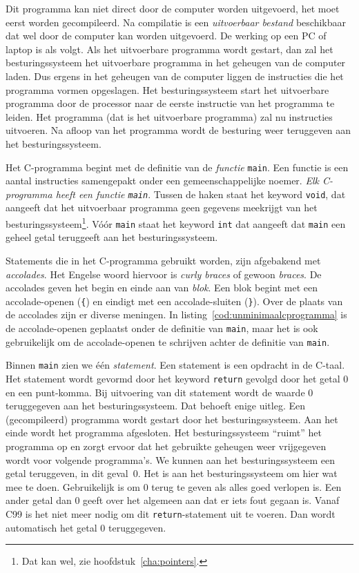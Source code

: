 Dit programma kan niet direct door de computer worden uitgevoerd, het moet eerst worden gecompileerd. Na compilatie is een \textsl{uitvoerbaar bestand} beschikbaar dat wel door de computer kan worden uitgevoerd. De werking op een PC of laptop is als volgt. Als het uitvoerbare programma wordt gestart, dan zal het besturingssysteem het uitvoerbare programma in het geheugen van de computer laden. Dus ergens in het geheugen van de computer liggen de instructies die het programma vormen opgeslagen. Het besturingssysteem start het uitvoerbare programma door de processor naar de eerste instructie van het programma te leiden. Het programma (dat is het uitvoerbare programma) zal nu instructies uitvoeren. Na afloop van het programma wordt de besturing weer teruggeven aan het besturingssysteem.

Het C-programma begint met de definitie van de \textsl{functie} \texttt{main}. Een functie is een aantal instructies samengepakt onder een gemeenschappelijke noemer. \textsl{Elk C-programma heeft een functie \texttt{main}}. Tussen de haken staat het keyword \texttt{void}, dat aangeeft dat het uitvoerbaar programma geen gegevens meekrijgt van het besturingssysteem\footnote{Dat kan wel, zie hoofdstuk~\ref{cha:pointers}.}. Vóór \texttt{main} staat het keyword \texttt{int} dat aangeeft dat \texttt{main} een geheel getal teruggeeft aan het besturingssysteem.
 
Statements die in het C-programma gebruikt worden, zijn afgebakend met \textsl{accolades}. Het Engelse woord hiervoor is \textsl{curly braces} of gewoon \textsl{braces}. De accolades geven het begin en einde aan van \textsl{blok}. Een blok begint met een accolade-openen (\texttt{\{}) en eindigt met een accolade-sluiten (\texttt{\}}). Over de plaats van de accolades zijn er diverse meningen. In listing~\ref{cod:unminimaalcprogramma} is de accolade-openen geplaatst onder de definitie van \texttt{main}, maar het is ook gebruikelijk om de accolade-openen te schrijven achter de definitie van \texttt{main}.
 
Binnen \texttt{main} zien we één \textsl{statement}. Een statement is een opdracht in de C-taal. Het statement wordt gevormd door het keyword \texttt{return} gevolgd door het getal 0 en een punt-komma. Bij uitvoering van dit statement wordt de waarde 0 teruggegeven aan het besturingssysteem. Dat behoeft enige uitleg. Een (gecompileerd) programma wordt gestart door het besturingssysteem. Aan het einde wordt het programma afgesloten. Het besturingssysteem ``ruimt'' het programma op en zorgt ervoor dat het gebruikte geheugen weer vrijgegeven wordt voor volgende programma's. We kunnen aan het besturingssysteem een getal teruggeven, in dit geval~0. Het is aan het besturingssysteem om hier wat mee te doen. Gebruikelijk is om 0 terug te geven als alles goed verlopen is. Een ander getal dan 0 geeft over het algemeen aan dat er iets fout gegaan is. Vanaf C99 is het niet meer nodig om dit \texttt{return}-statement uit te voeren. Dan wordt automatisch het getal 0 teruggegeven.


